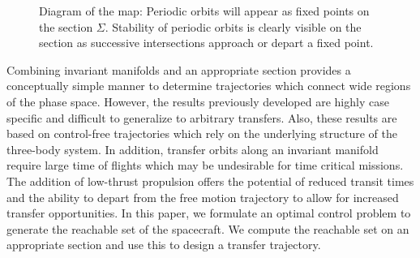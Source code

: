\documentclass[smallcondensed]{svjour3}
\begin{document}
\begin{figure}
        \centering
        \begin{scaletikzpicturetowidth}{0.5\textwidth}
    \end{scaletikzpicturetowidth}
    \caption{Diagram of the \Poincare map: Periodic orbits will appear as fixed points on the \Poincare section \( \Sigma \). Stability of periodic orbits is clearly visible on the section as successive intersections approach or depart a fixed point.\label{fig:poincare_map}}
\end{figure}

Combining invariant manifolds and an appropriate \Poincare section provides a conceptually simple manner to determine trajectories which connect wide regions of the phase space.
However, the results previously developed are highly case specific and difficult to generalize to arbitrary transfers.
Also, these results are based on control-free trajectories which rely on the underlying structure of the three-body system.
In addition, transfer orbits along an invariant manifold require large time of flights which may be undesirable for time critical missions.
The addition of low-thrust propulsion offers the potential of reduced transit times and the ability to depart from the free motion trajectory to allow for increased transfer opportunities. 
In this paper, we formulate an optimal control problem to generate the reachable set of the spacecraft.
We compute the reachable set on an appropriate \Poincare section and use this to design a transfer trajectory.
\end{document}
